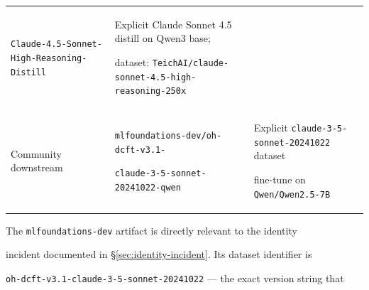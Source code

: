 \begin{table}[h]
\begin{tabular}{p{3cm}p{5cm}p{4.5cm}}
  \texttt{Claude-4.5-Sonnet-High-Reasoning-Distill} &





  Explicit Claude Sonnet 4.5 distill on Qwen3 base;





  dataset: \texttt{TeichAI/claude-sonnet-4.5-high-reasoning-250x} \\





Community downstream & \texttt{mlfoundations-dev/oh-dcft-v3.1-} \newline





  \texttt{claude-3-5-sonnet-20241022-qwen} &





  Explicit \texttt{claude-3-5-sonnet-20241022} dataset





  fine-tune on \texttt{Qwen/Qwen2.5-7B} \\





\bottomrule





\end{tabular}





\end{table}











The \texttt{mlfoundations-dev} artifact is directly relevant to the identity





incident documented in \S\ref{sec:identity-incident}. Its dataset identifier is





\texttt{oh-dcft-v3.1-claude-3-5-sonnet-20241022} --- the exact version string that





